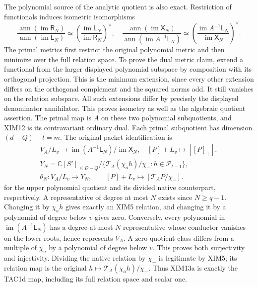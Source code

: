 \documentclass[11pt,a4paper]{article}
\begin{document}
The polynomial source of the analytic quotient is also exact.
Restriction of functionals induces isometric isomorphisms
\[
 \frac{\operatorname{ann}(\operatorname{im}\mathsf R_N)}
      {\operatorname{ann}(\operatorname{im}\mathsf L_N)}
   \simeq
 \left(\frac{\operatorname{im}\mathsf L_N}
               {\operatorname{im}\mathsf R_N}\right)^\vee,
 \quad
 \frac{\operatorname{ann}(\operatorname{im}\mathsf X_N)}
      {\operatorname{ann}(\operatorname{im}A^{-1}\mathsf L_N)}
   \simeq
 \left(\frac{\operatorname{im}A^{-1}\mathsf L_N}
               {\operatorname{im}\mathsf X_N}\right)^\vee.
 \tag{XIM13}
\]
The primal metrics first restrict the original polynomial metric and
then minimize over the full relation space. To prove the dual metric
claim, extend a functional from the larger displayed polynomial
subspace by composition with its orthogonal projection. This is the
minimum extension, since every other extension differs on the
orthogonal complement and the squared norms add. It still vanishes
on the relation subspace. All such extensions differ by precisely
the displayed denominator annihilator. This proves isometry as well
as the algebraic quotient assertion. The primal map is $A$ on these
two polynomial subquotients, and XIM12 is its contravariant ordinary
dual. Each primal subquotient has dimension $(d-Q)-t=m$.
The original packet identification is
\[
\begin{gathered}
 V_A/L_v\longrightarrow
 \operatorname{im}(A^{-1}\mathsf L_N)/\operatorname{im}\mathsf X_N,
 \quad [P]+L_v\longmapsto[[P]_+],\\
 Y_N=\mathbb C[S']_{\le D-Q}\big/
   \{\mathcal T_A(\chi_a h)/\chi_-:h\in\mathcal P_{t-1}\},\\
 \theta_N:V_A/L_v\longrightarrow Y_N,\qquad
 [P]+L_v\longmapsto[\mathcal T_AP/\chi_-].
\end{gathered}
 \tag{XIM13a}
\]
for the upper polynomial quotient and its divided native counterpart,
respectively. A representative of degree at most $N$ exists since
$N\ge q-1$. Changing it by $\chi_a h$ gives exactly an XIM5 relation,
and changing it by a polynomial of degree below $v$ gives zero.
Conversely, every polynomial in $\operatorname{im}(A^{-1}\mathsf L_N)$
has a degree-at-most-$N$ representative whose conductor vanishes on
the lower roots, hence represents $V_A$. A zero quotient class differs
from a multiple of $\chi_a$ by a polynomial of degree below $v$.
This proves both surjectivity and injectivity. Dividing the native
relation by $\chi_-$ is legitimate by XIM5; its relation map is the
original $h\mapsto\mathcal T_A(\chi_a h)/\chi_-$. Thus XIM13a is
exactly the TAC1d map, including its full relation space and scalar one.
\end{document}
